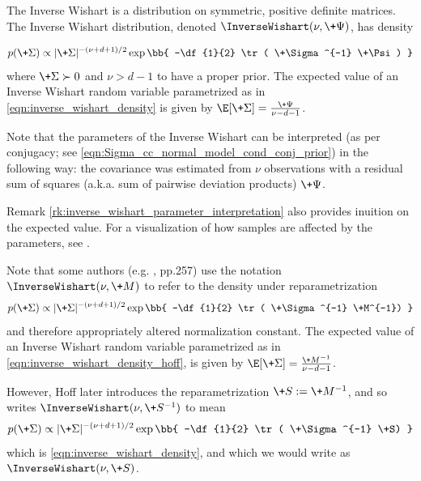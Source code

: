 \documentclass{article} %
\begin{document}
The Inverse Wishart is a distribution on symmetric,  positive definite matrices.     The Inverse Wishart distribution,  denoted $\InverseWishart(\nu, \+\Psi)$,  has density

\begin{align}
p(\+\Sigma) \propto | \+\Sigma|^{-(\nu+d +1) /2}  \exp \bb{ -\df{1}{2} \tr ( \+\Sigma^{-1} \+\Psi) } 
\label{eqn:inverse_wishart_density}
\end{align}
where $\+\Sigma \succ 0$ and $\nu > d-1$ to have a proper prior.     The expected value of an Inverse Wishart random variable parametrized as in \eqref{eqn:inverse_wishart_density} is given by $\E[\+\Sigma] = \frac{\+\Psi}{\nu -d -1}$.   

\begin{remark}{}
\label{rk:inverse_wishart_parameter_interpretation}
Note that the parameters of the Inverse Wishart can be interpreted (as per conjugacy;  see \eqref{eqn:Sigma_cc_normal_model_cond_conj_prior}) in the following way: the covariance was estimated from $\nu$ observations with a residual sum of squares (a.k.a.  sum of pairwise deviation products) $\+\Psi$. 
 
\end{remark}

Remark \ref{rk:inverse_wishart_parameter_interpretation} also provides inuition on the expected value.      For a visualization of how samples are affected by the parameters,  see \cite{hughes2012inverse}. 

\begin{remark}{}
\label{rk:peter_hoffs_notation_for_inverse_wishart}
Note that some authors (e.g.  \cite{hoff2009first},  pp.257) use the notation $\InverseWishart(\nu,  \+M)$ to refer to the density under reparametrization
\begin{align}
p(\+\Sigma) \propto | \+\Sigma|^{-(\nu+d +1) /2}  \exp \bb{ -\df{1}{2} \tr ( \+\Sigma^{-1} \+M^{-1}) } 
\label{eqn:inverse_wishart_density_hoff}
\end{align}
and therefore appropriately altered normalization constant.  The expected value of an Inverse Wishart random variable parametrized as in   \eqref{eqn:inverse_wishart_density_hoff},  is given by $\E[\+\Sigma] = \frac{\+M^{-1}}{\nu -d -1}$.     

However,  Hoff later introduces the reparametrization $\+S := \+M^{-1}$,  and so writes $\InverseWishart(\nu, \+S^{-1})$ to mean 
\begin{align}
p(\+\Sigma) \propto | \+\Sigma|^{-(\nu+d +1) /2}  \exp \bb{ -\df{1}{2} \tr ( \+\Sigma^{-1} \+S) } 
\label{eqn:inverse_wishart_density_hoffs_alternate}
\end{align}
which is \eqref{eqn:inverse_wishart_density}, and which we would write as $\InverseWishart(\nu, \+S)$.
 
\end{remark}
\end{document}
